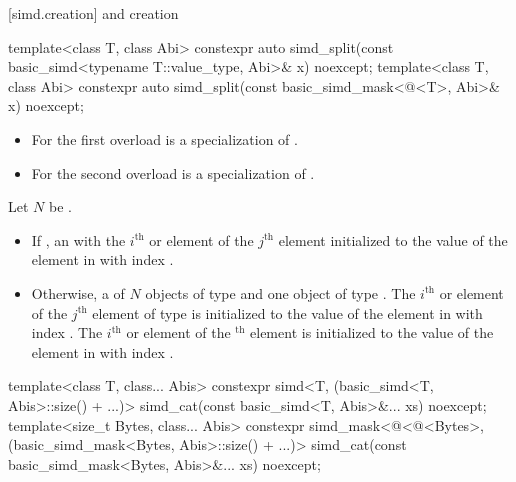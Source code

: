 [simd.creation]{ and  creation}

\begin{itemdecl}
template<class T, class Abi>
  constexpr auto simd_split(const basic_simd<typename T::value_type, Abi>& x) noexcept;
template<class T, class Abi>
  constexpr auto simd_split(const basic_simd_mask<@\maskelementsize@<T>, Abi>& x) noexcept;
\end{itemdecl}

\begin{itemdescr}

  \pnum\constraints
  \begin{itemize}
    \item For the first overload  is a specialization of .
    \item For the second overload  is a specialization of .
  \end{itemize}

  \pnum Let $N$ be .

    \pnum\returns
    \begin{itemize}
      \item If , an  with
        the $i^\text{th}$ \simd or \mask element of the $j^\text{th}$ 
        element initialized to the value of the element in  with index
        .

      \item Otherwise, a  of $N$ objects of type  and one
        object of type .
        The $i^\text{th}$ \simd or \mask element of the $j^\text{th}$
         element of type  is initialized to the value of
        the element in  with index .
        The $i^\text{th}$ \simd or \mask element of the $^\text{th}$
         element is initialized to the value of the element in
         with index .
    \end{itemize}
  \end{itemdescr}

\begin{itemdecl}
template<class T, class... Abis>
  constexpr simd<T, (basic_simd<T, Abis>::size() + ...)>
    simd_cat(const basic_simd<T, Abis>&... xs) noexcept;
template<size_t Bytes, class... Abis>
  constexpr simd_mask<@\deducet@<@\integerfrom@<Bytes>, (basic_simd_mask<Bytes, Abis>::size() + ...)>
    simd_cat(const basic_simd_mask<Bytes, Abis>&... xs) noexcept;

\end{itemdecl}

